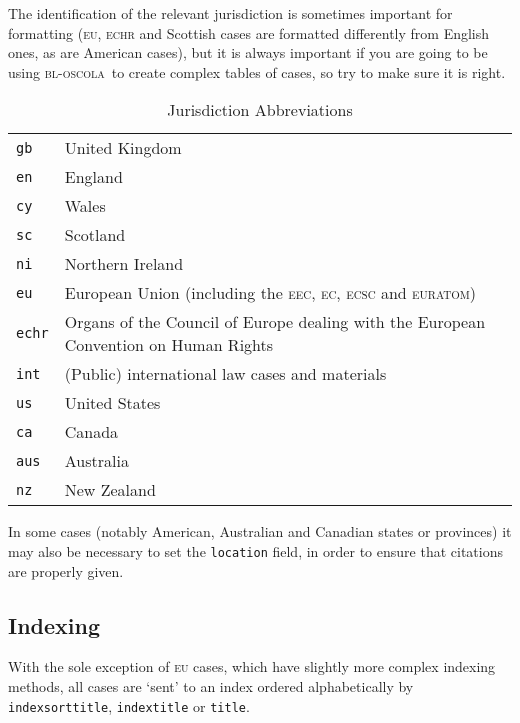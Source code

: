 \documentclass[a4paper,
               11pt,
	       DIV=1,			   
	       footinclude=false]
	      {scrartcl}
\newcommand{\oscola}{\textsc{bl-oscola}}
\begin{document}
The identification of the relevant jurisdiction is sometimes important
for formatting (\textsc{eu}, \textsc{echr} and Scottish cases are
formatted differently from English ones, as are American cases), but
it is always important if you are going to be using \oscola\ to create
complex tables of cases, so try to make sure it is right.

\begin{table}
\centering
{}
\begin{tabular*}{10cm}{l p{8cm}}
\toprule
\texttt{gb}   & United Kingdom \\
\texttt{en}   & England \\
\texttt{cy}   & Wales \\
\texttt{sc}   & Scotland \\
\texttt{ni}   & Northern Ireland \\
\texttt{eu}   & European Union (including the \textsc{eec}, \textsc{ec},
	        \textsc{ecsc} and \textsc{euratom}) \\
\texttt{echr} & Organs of the Council of Europe dealing with the
	        European Convention on Human Rights \\
\texttt{int}  & (Public) international law cases and materials \\
\texttt{us}   & United States \\
\texttt{ca}   & Canada \\
\texttt{aus}  & Australia \\
\texttt{nz}   & New Zealand \\\bottomrule
\end{tabular*}
\caption{Jurisdiction Abbreviations\label{juristable}}
\end{table}

In some cases (notably American, Australian and Canadian states or
provinces) it may also be necessary to set the \texttt{location}
field, in order to ensure that citations are properly given.

\subsection{Indexing}


With the sole exception of \textsc{eu} cases, which have slightly more
complex indexing methods, all cases are `sent' to an index ordered
alphabetically by \texttt{indexsorttitle}, \texttt{indextitle} or
\texttt{title}.
\end{document}
